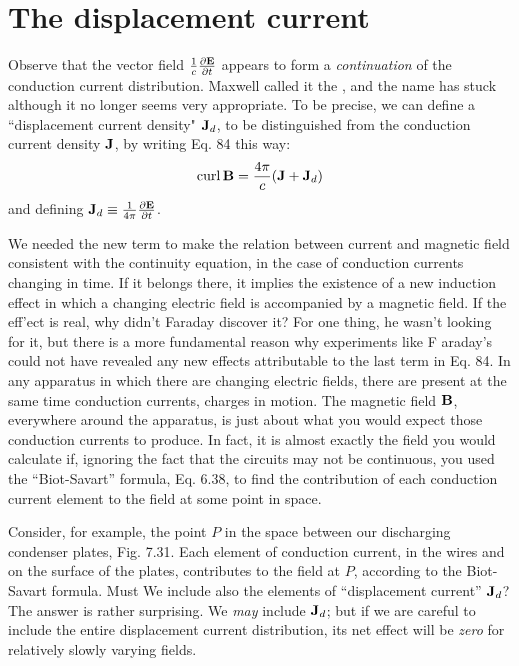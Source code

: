 \section{The displacement current}

Observe that the vector field $\frac{1}{c}\frac{\partial\mathbf{E}}{\partial t}$
appears to form a \emph{continuation}
of the conduction current distribution. Maxwell called it the , and the name has stuck although it no longer
seems very appropriate. To be precise, we can define a
``displacement current density" $\mathbf{J}_d$, to be distinguished from the conduction
current density $\mathbf{J}$, by writing Eq. 84 this way:
\begin{equation}
  \operatorname{curl}\mathbf{B} = \frac{4\pi}{c}(\mathbf{J}+\mathbf{J}_d)
\end{equation}
and defining $\mathbf{J}_d \equiv \frac{1}{4\pi}\frac{\partial\mathbf{E}}{\partial t}$.

We needed the new term to make the relation between current and
magnetic field consistent with the continuity equation, in the case
of conduction currents changing in time. If it belongs there, it
implies the existence of a new induction effect in which a changing
electric field is accompanied by a magnetic field. If the eff'ect is real,
why didn't Faraday discover it? For one thing, he wasn't looking
for it, but there is a more fundamental reason why experiments like
F araday's could not have revealed any new effects attributable to the
last term in Eq. 84. In any apparatus in which there are changing
electric fields, there are present at the same time conduction currents,
charges in motion. The magnetic field $\mathbf{B}$, everywhere around the
apparatus, is just about what you would expect those conduction
currents to produce. In fact, it is almost exactly the field you would
calculate if, ignoring the fact that the circuits may not be continuous,
you used the ``Biot-Savart'' formula, Eq. 6.38, to find the contribution
of each conduction current element to the field at some point in space.

Consider, for example, the point $P$ in the space between our discharging
condenser plates, Fig. 7.31. Each element of conduction
current, in the wires and on the surface of the plates, contributes to
the field at $P$, according to the Biot-Savart formula. Must We include
also the elements of ``displacement current'' $\mathbf{J}_d$? The answer is rather
surprising. We \emph{may} include $\mathbf{J}_d$; but if we are careful to include the
entire displacement current distribution, its net effect will be \emph{zero} for
relatively slowly varying fields.

